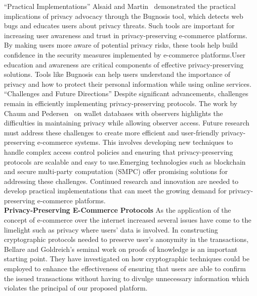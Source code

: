 \documentclass[12pt]{article}
\begin{document}
“Practical Implementations” Alsaid and Martin~\cite{Alsaid2002} demonstrated the practical implications of privacy advocacy through the Bugnosis tool, which detects web bugs and educates users about privacy threats. Such tools are important for increasing user awareness and trust in privacy-preserving e-commerce platforms. By making users more aware of potential privacy risks, these tools help build confidence in the security measures implemented by e-commerce platforms.User education and awareness are critical components of effective privacy-preserving solutions. Tools like Bugnosis can help users understand the importance of privacy and how to protect their personal information while using online services.\\



“Challenges and Future Directions” Despite significant advancements, challenges remain in efficiently implementing privacy-preserving protocols. The work by Chaum and Pedersen ~\cite{Chaum1992}on wallet databases with observers highlights the difficulties in maintaining privacy while allowing observer access. Future research must address these challenges to create more efficient and user-friendly privacy-preserving e-commerce systems. This involves developing new techniques to handle complex access control policies and ensuring that privacy-preserving protocols are scalable and easy to use.Emerging technologies such as blockchain and secure multi-party computation (SMPC) offer promising solutions for addressing these challenges. Continued research and innovation are needed to develop practical implementations that can meet the growing demand for privacy-preserving e-commerce platforms.\\

\textbf{Privacy-Preserving E-Commerce Protocols}
As the application of the concept of e-commerce over the internet increased several issues have come to the limelight such as privacy where users’ data is involved. In constructing cryptographic protocols needed to preserve user’s anonymity in the transactions, Bellare and Goldreich’s seminal work on proofs of knowledge is an important starting point. They have investigated on how cryptographic techniques could be employed to enhance the effectiveness of ensuring that users are able to confirm the issued transactions without having to divulge unnecessary information which violates the principal of our proposed platform.~\cite{Bellare2007}\\
\end{document}

